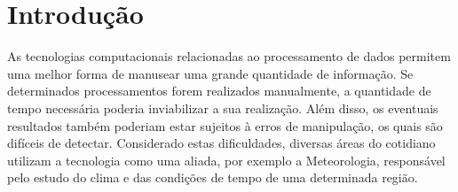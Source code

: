 \chapter{Introdução}

As tecnologias computacionais relacionadas ao processamento de dados permitem uma melhor forma de manusear uma grande quantidade de informação. Se determinados processamentos forem realizados manualmente, a quantidade de tempo necessária poderia inviabilizar a sua realização. Além disso, os eventuais resultados também poderiam estar sujeitos à erros de manipulação, os quais são difíceis de detectar. Considerado estas dificuldades, diversas áreas do cotidiano utilizam a tecnologia como uma aliada, por exemplo a Meteorologia, responsável pelo estudo do clima e das condições de tempo de uma determinada região.